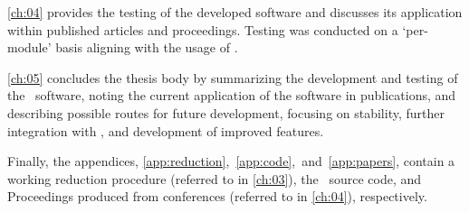 \autoref{ch:04} provides the testing of the developed software and discusses its application within published articles and proceedings.
Testing was conducted on a `per-module' basis aligning with the usage of \stops.

\autoref{ch:05} concludes the thesis body by summarizing the development and testing of the \stops\ software, noting the current application of the software in publications, and describing possible routes for future development, focusing on stability, further integration with \polsalt, and development of improved features.

Finally, the appendices, \autoref{app:reduction},~\ref{app:code},~and~\ref{app:papers}, contain a working reduction procedure (referred to in \autoref{ch:03}), the \stops\ source code, and Proceedings produced from conferences (referred to in \autoref{ch:04}), respectively.
